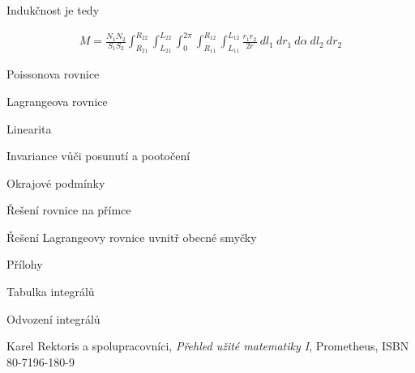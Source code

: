 \documentclass{book}
\begin{document}
Indukčnost je tedy

\begin{equation}
\label{eq:indukcnost_1}
\begin{split}
M = \frac{N_1 N_2}{S_1 S_2} \int_{R_{21}}^{R_{22}} \int_{L_{21}}^{L_{22}} \int_{0}^{2 \pi} \int_{R_{11}}^{R_{12}} \int_{L_{11}}^{L_{12}} \frac{r_1 r_2}{2 r} \ dl_1 \ dr_1 \ d \alpha \ dl_2 \ dr_2
\end{split}
\end{equation}


Poissonova rovnice

Lagrangeova rovnice

Linearita

Invariance vůči posunutí a pootočení

Okrajové podmínky

Řešení rovnice na přímce

Řešení Lagrangeovy rovnice uvnitř obecné smyčky

Přílohy

Tabulka integrálů

Odvození integrálů

\begin{thebibliography}{9}

Karel Rektoris a spolupracovníci,
\textit{Přehled užité matematiky I},
Prometheus,
ISBN 80-7196-180-9
\end{thebibliography}
\end{document}
